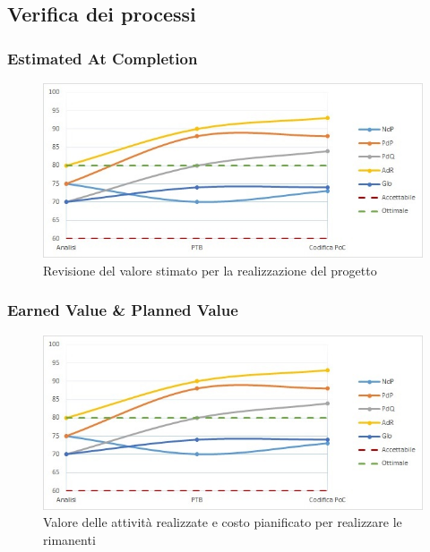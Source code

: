 
\subsection{Verifica dei processi}\label{subsection:verifica_processi}
\subsubsection{Estimated At Completion}
\begin{figure}[H]
  \centering
  \includegraphics[scale=0.8]{immagini/gulpease.jpg}
  \caption{Revisione del valore stimato per la realizzazione del progetto}
\end{figure}

\subsubsection{Earned Value \& Planned Value}
\begin{figure}[H]
  \centering
  \includegraphics[scale=0.8]{immagini/gulpease.jpg}
  \caption{Valore delle attività realizzate e costo pianificato per realizzare le rimanenti}
\end{figure}

